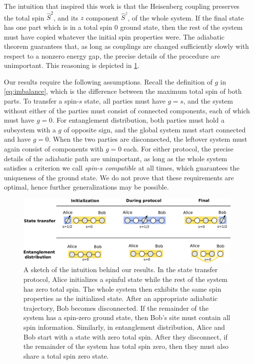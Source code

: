 The intuition that inspired this work is that the Heisenberg coupling preserves the total spin $\hat{S}^2$, and its $z$ component $\hat{S}^z$, of the whole system. If the final state has one part which is in a total spin $0$ ground state, then the rest of the system must have copied whatever the initial spin properties were. The adiabatic theorem guarantees that, as long as couplings are changed sufficiently slowly with respect to a nonzero energy gap, the precise details of the procedure are unimportant. This reasoning is depicted in \cref{fig:protocolsketch}.

Our results require the following assumptions. Recall the definition of $g$ in \cref{eq:imbalance}, which is the difference between the maximum total spin of both parts. To transfer a spin-$s$ state, all parties must have $g=s$, and the system without either of the parties must consist of connected components, each of which must have $g=0$. For entanglement distribution, both parties must hold a subsystem with a $g$ of opposite sign, and the global system must start connected and have $g=0$. When the two parties are disconnected, the leftover system must again consist of components with $g=0$ each. For either protocol, the precise details of the adiabatic path are unimportant, as long as the whole system satisfies a criterion we call \emph{spin-$s$ compatible} at all times, which guarantees the uniqueness of the ground state. We do not prove that these requirements are optimal, hence further generalizations may be possible. 

\begin{figure}
\begin{center}
\includegraphics[width=\textwidth]{img_manuscript/protocol_sketch.pdf} 
\end{center}
\caption{A sketch of the intuition behind our results. In the state transfer protocol, Alice initializes a spinful state while the rest of the system has zero total spin. The whole system then exhibits the same spin properties as the initialized state. After an appropriate adiabatic trajectory, Bob becomes disconnected. If the remainder of the system has a spin-zero ground state, then Bob's site must contain all spin information. Similarly, in entanglement distribution, Alice and Bob start with a state with zero total spin. After they disconnect, if the remainder of the system has total spin zero, then they must also share a total spin zero state. }
\label{fig:protocolsketch}
\end{figure}



